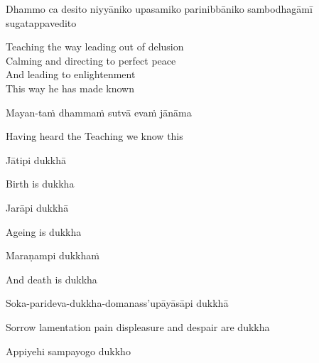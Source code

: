 \begin{pali-hang}
  Dhammo ca desito niyyāniko upasamiko parinibbāniko sambodhagāmī sugatappavedito
\end{pali-hang}

\begin{english-verses}
    Teaching the way leading out of delusion\makeatletter\hyperlink{endnote13-appendix}\makeatother\\

  Calming and directing to perfect peace\\
  And leading to enlightenment\\
  This way he has made known\\
\end{english-verses}

Mayan-taṁ dhammaṁ sutvā evaṁ jānāma

\begin{english}
  Having heard the Teaching we know this
\end{english}

Jātipi dukkhā

\begin{english}
  Birth is dukkha
\end{english}

Jarāpi dukkhā

\begin{english}
  Ageing is dukkha
\end{english}

Maraṇampi dukkhaṁ

\begin{english}
  And death is dukkha
\end{english}

Soka-parideva-dukkha-domanass'upāyāsāpi dukkhā

\begin{english}
    Sorrow lamentation pain displeasure\makeatletter\hyperlink{endnote14-appendix}\makeatother
  and despair are dukkha
\end{english}

Appiyehi sampayogo dukkho

